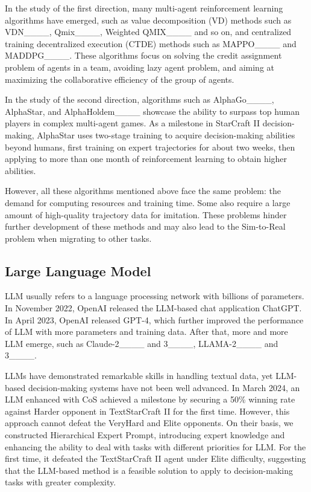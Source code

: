 In the study of the first direction, many multi-agent reinforcement learning algorithms have emerged, such as value decomposition (VD) methods such as VDN____, Qmix____, Weighted QMIX____ and so on, and centralized training decentralized execution (CTDE) methods such as MAPPO____ and MADDPG____. These algorithms focus on solving the credit assignment problem of agents in a team, avoiding lazy agent problem, and aiming at maximizing the collaborative efficiency of the group of agents.

In the study of the second direction, algorithms such as AlphaGo____, AlphaStar, and AlphaHoldem____ showcase the ability to surpass top human players in complex multi-agent games. As a milestone in StarCraft II decision-making, AlphaStar uses two-stage training to acquire decision-making abilities beyond humans, first training on expert trajectories for about two weeks, then applying to more than one month of reinforcement learning to obtain higher abilities. 

However, all these algorithms mentioned above face the same problem: the demand for computing resources and training time. Some also require a large amount of high-quality trajectory data for imitation. These problems hinder further development of these methods and may also lead to the Sim-to-Real problem when migrating to other tasks.

\subsection{Large Language Model}
LLM usually refers to a language processing network with billions of parameters. In November 2022, OpenAI released the LLM-based chat application ChatGPT. In April 2023, OpenAI released GPT-4, which further improved the performance of LLM with more parameters and training data. After that, more and more LLM emerge, such as Claude-2____ and 3____, LLAMA-2____ and 3____.

LLMs have demonstrated remarkable skills in handling textual data, yet LLM-based decision-making systems have not been well advanced. In March 2024, an LLM enhanced with CoS achieved a milestone by securing a 50\% winning rate against Harder opponent in TextStarCraft II for the first time. However, this approach cannot defeat the VeryHard and Elite opponents. On their basis, we constructed Hierarchical Expert Prompt, introducing expert knowledge and enhancing the ability to deal with tasks with different priorities for LLM. For the first time, it defeated the TextStarCraft II agent under Elite difficulty, suggesting that the LLM-based method is a feasible solution to apply to decision-making tasks with greater complexity.
%
%
%
%
%